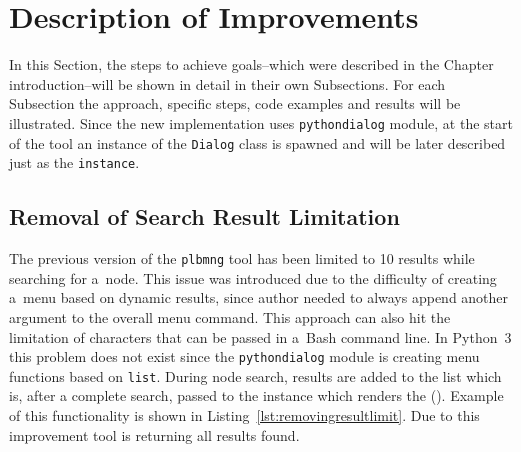 \section{Description of Improvements}
\label{section:implementapproach}
In this Section, the steps to achieve goals--which were described in the Chapter introduction--will be shown in detail in their own Subsections. For each Subsection the approach, specific steps, code examples and results will be illustrated. Since the new implementation uses \texttt{pythondialog} module, at the start of the tool an instance of the \texttt{Dialog} class is spawned and will be later described just as the \texttt{instance}.
\subsection{Removal of Search Result Limitation}
The previous version of the \texttt{plbmng} tool has been limited to 10 results while searching for a~node. This issue was introduced due to the difficulty of creating a~menu based on dynamic results, since author needed to always append another argument to the overall menu command. This approach can also hit the limitation of characters that can be passed in a~Bash command line. In Python~3 this problem does not exist since the \texttt{pythondialog} module is creating menu functions based on \texttt{list}. During node search, results are added to the list which is, after a complete search, passed to the instance which renders the  (). Example of this functionality is shown in Listing~\ref{lst:removingresultlimit}. Due to this improvement tool is returning all results found.

